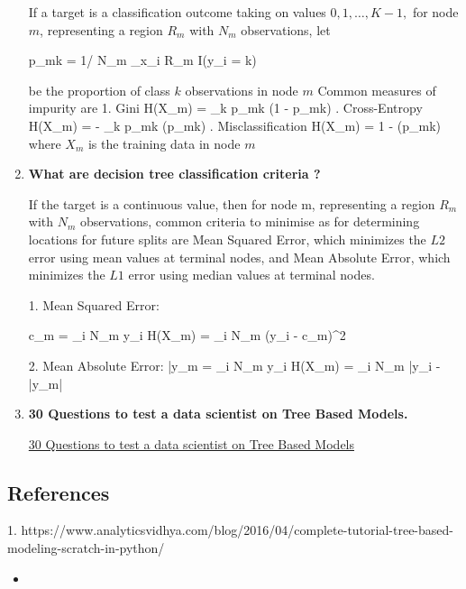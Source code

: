 \begin{enumerate}
If a target is a classification outcome taking on values $0,1,…,K-1,$ for node $m$, representing a region $R_m$ with $N_m$ observations, let

\bea
p_{mk} = 1/ N_m \sum_{x_i \in R_m} I(y_i = k)
\eea

be the proportion of class $k$ observations in node $m$
Common measures of impurity are 
1. Gini
\bea
H(X_m) = \sum_k p_{mk} (1 - p_{mk})
. Cross-Entropy
\bea
H(X_m) = - \sum_k p_{mk} \log(p_{mk})
. Misclassification
\bea
H(X_m) = 1 - \max(p_{mk})
\eea
where $X_m$ is the training data in node $m$



\item{\textbf{\color{blue}  What are decision tree classification criteria ?}} 

If the target is a continuous value, then for node m, representing a region $R_m$ with $N_m$ observations, common criteria to minimise as for determining locations for future splits are Mean Squared Error, which minimizes the $L2$ error using mean values at terminal nodes, and Mean Absolute Error, which minimizes the $L1$ error using median values at terminal nodes.

1. Mean Squared Error:

\bea
c_m =  \sum_{i \in N_m} y_i\cr
H(X_m) =  \sum_{i \in N_m} (y_i - c_m)^2
\eea

2. Mean Absolute Error:
\bea
\bar{y_m} =  \sum_{i \in N_m} y_i
H(X_m) =  \sum_{i \in N_m} |y_i - \bar{y_m}|
\eea


\item{\textbf{\color{blue} 30 Questions to test a data scientist on Tree Based Models.}}

\href{https://www.analyticsvidhya.com/blog/2017/09/30-questions-test-tree-based-models/}{30 Questions to test a data scientist on Tree Based Models}





\end{enumerate}

\subsection{References}
1. https://www.analyticsvidhya.com/blog/2016/04/complete-tutorial-tree-based-modeling-scratch-in-python/





\begin{itemize}
\item 
\end{itemize}